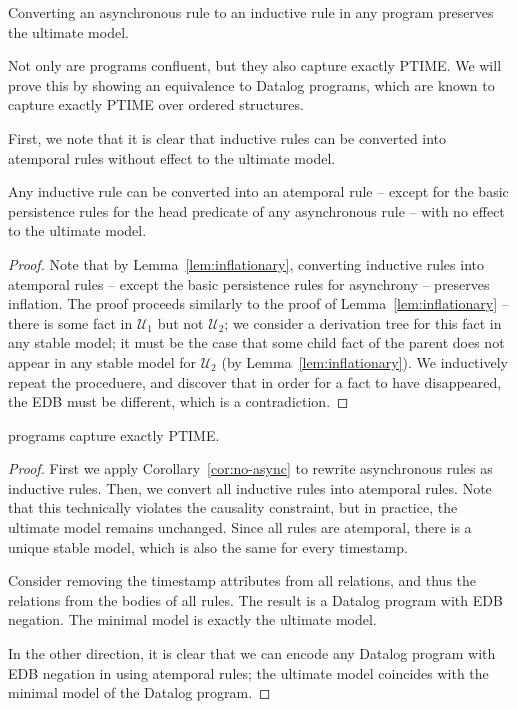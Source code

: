 \begin{corollary}
\label{cor:no-async}
Converting an asynchronous rule to an inductive rule in any \slang program preserves the ultimate model.
\end{corollary}

Not only are \slang programs confluent, but they also capture exactly PTIME.  We will prove this by showing an equivalence to Datalog programs, which are known to capture exactly PTIME over ordered structures.

First, we note that it is clear that inductive rules can be converted into atemporal rules without effect to the ultimate model.

\begin{lemma}
\label{cor:no-inductive}
Any inductive rule can be converted into an atemporal rule -- except for the basic persistence rules for the head predicate of any asynchronous rule -- with no effect to the ultimate model.
\end{lemma}
\begin{proof}
Note that by Lemma~\ref{lem:inflationary}, converting inductive rules into atemporal rules -- except the basic persistence rules for asynchrony -- preserves inflation.  The proof proceeds similarly to the proof of Lemma~\ref{lem:inflationary} -- there is some fact in $\mathcal{U}_1$ but not $\mathcal{U}_2$; we consider a derivation tree for this fact in any stable model; it must be the case that some child fact of the parent does not appear in any stable model for $\mathcal{U}_2$ (by Lemma~\ref{lem:inflationary}).  We inductively repeat the proceduere, and discover that in order for a fact to have disappeared, the EDB must be different, which is a contradiction.
\end{proof}


\begin{theorem}
\slang programs capture exactly PTIME.
\end{theorem}
\begin{proof}
First we apply Corollary~\ref{cor:no-async} to rewrite asynchronous rules as inductive rules.  Then, we convert all inductive rules into atemporal rules.  Note that this technically violates the causality constraint, but in practice, the ultimate model remains unchanged.  Since all rules are atemporal, there is a unique stable model, which is also the same for every timestamp.

Consider removing the timestamp attributes from all relations, and thus the  relations from the bodies of all rules.  The result is a Datalog program with EDB negation.  The minimal model is exactly the ultimate model.

In the other direction, it is clear that we can encode any Datalog program with EDB negation in \slang using atemporal rules; the ultimate model coincides with the minimal model of the Datalog program.
\end{proof}

